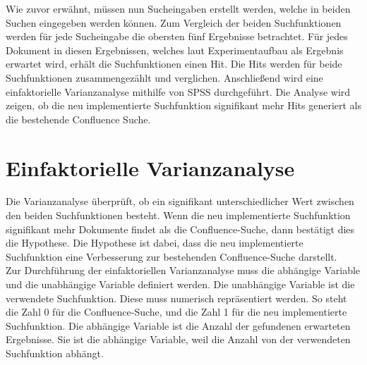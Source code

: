 Wie zuvor erwähnt, müssen nun Sucheingaben erstellt werden, welche in beiden Suchen eingegeben werden können.
Zum Vergleich der beiden Suchfunktionen werden für jede Sucheingabe die obersten fünf Ergebnisse betrachtet.
Für jedes Dokument in diesen Ergebnissen, welches laut Experimentaufbau als Ergebnis erwartet wird, erhält die Suchfunktionen einen Hit.
Die Hits werden für beide Suchfunktionen zusammengezählt und verglichen.
Anschließend wird eine einfaktorielle Varianzanalyse mithilfe von SPSS durchgeführt.
Die Analyse wird zeigen, ob die neu implementierte Suchfunktion signifikant mehr Hits generiert als die bestehende Confluence Suche.

\section{Einfaktorielle Varianzanalyse}
Die Varianzanalyse überprüft, ob ein signifikant unterschiedlicher Wert zwischen den beiden Suchfunktionen besteht.
Wenn die neu implementierte Suchfunktion signifikant mehr Dokumente findet als die Confluence-Suche, dann bestätigt dies die Hypothese.
Die Hypothese ist dabei, dass die neu implementierte Suchfunktion eine Verbesserung zur bestehenden Confluence-Suche darstellt.\\

Zur Durchführung der einfaktoriellen Varianzanalyse muss die abhängige Variable und die unabhängige Variable definiert werden.
Die unabhängige Variable ist die verwendete Suchfunktion.
Diese muss numerisch repräsentiert werden.
So steht die Zahl 0 für die Confluence-Suche, und die Zahl 1 für die neu implementierte Suchfunktion.
Die abhängige Variable ist die Anzahl der gefundenen erwarteten Ergebnisse.
Sie ist die abhängige Variable, weil die Anzahl von der verwendeten Suchfunktion abhängt.
